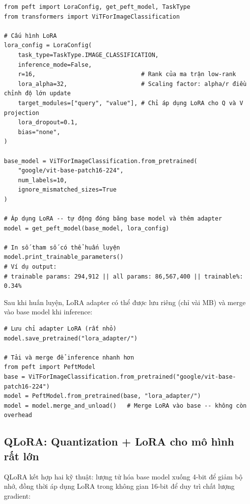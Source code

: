 \begin{verbatim}
from peft import LoraConfig, get_peft_model, TaskType
from transformers import ViTForImageClassification

# Cấu hình LoRA
lora_config = LoraConfig(
    task_type=TaskType.IMAGE_CLASSIFICATION,
    inference_mode=False,
    r=16,                              # Rank của ma trận low-rank
    lora_alpha=32,                     # Scaling factor: alpha/r điều chỉnh độ lớn update
    target_modules=["query", "value"], # Chỉ áp dụng LoRA cho Q và V projection
    lora_dropout=0.1,
    bias="none",
)

base_model = ViTForImageClassification.from_pretrained(
    "google/vit-base-patch16-224",
    num_labels=10,
    ignore_mismatched_sizes=True
)

# Áp dụng LoRA -- tự động đóng băng base model và thêm adapter
model = get_peft_model(base_model, lora_config)

# In số tham số có thể huấn luyện
model.print_trainable_parameters()
# Ví dụ output:
# trainable params: 294,912 || all params: 86,567,400 || trainable%: 0.34%
\end{verbatim}

Sau khi huấn luyện, LoRA adapter có thể được lưu riêng (chỉ vài MB) và merge vào base model khi inference:

\begin{verbatim}
# Lưu chỉ adapter LoRA (rất nhỏ)
model.save_pretrained("lora_adapter/")

# Tải và merge để inference nhanh hơn
from peft import PeftModel
base = ViTForImageClassification.from_pretrained("google/vit-base-patch16-224")
model = PeftModel.from_pretrained(base, "lora_adapter/")
model = model.merge_and_unload()   # Merge LoRA vào base -- không còn overhead
\end{verbatim}

\subsection*{QLoRA: Quantization + LoRA cho mô hình rất lớn}

QLoRA kết hợp hai kỹ thuật: lượng tử hóa base model xuống 4-bit để giảm bộ nhớ, đồng thời áp dụng LoRA trong không gian 16-bit để duy trì chất lượng gradient:

